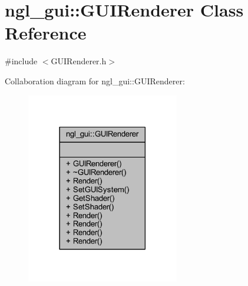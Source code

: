 \hypertarget{classngl__gui_1_1_g_u_i_renderer}{}\section{ngl\+\_\+gui\+:\+:G\+U\+I\+Renderer Class Reference}
\label{classngl__gui_1_1_g_u_i_renderer}


{\ttfamily \#include $<$G\+U\+I\+Renderer.\+h$>$}



Collaboration diagram for ngl\+\_\+gui\+:\+:G\+U\+I\+Renderer\+:\nopagebreak
\begin{figure}[H]
\begin{center}
\leavevmode
\includegraphics[width=189pt]{classngl__gui_1_1_g_u_i_renderer__coll__graph}
\end{center}
\end{figure}
